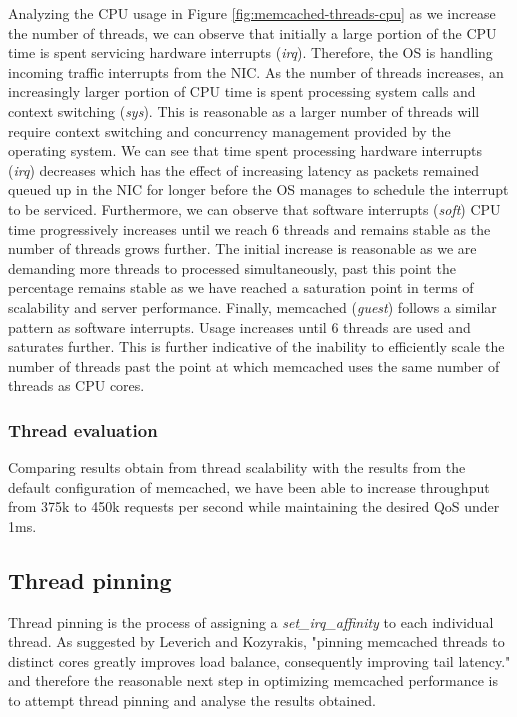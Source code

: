 Analyzing the CPU usage in Figure \ref{fig:memcached-threads-cpu} as we increase the number of threads, we can observe that initially a large portion of the CPU time is spent servicing hardware interrupts (\textit{irq}). Therefore, the OS is handling incoming traffic interrupts from the NIC. As the number of threads increases, an increasingly larger portion of CPU time is spent processing system calls and context switching (\textit{sys}). This is reasonable as a larger number of threads will require context switching and concurrency management provided by the operating system. We can see that time spent processing hardware interrupts (\textit{irq}) decreases which has the effect of increasing latency as packets remained queued up in the NIC for longer before the OS manages to schedule the interrupt to be serviced. Furthermore, we can observe that software interrupts (\textit{soft}) CPU time progressively increases until we reach 6 threads and remains stable as the number of threads grows further. The initial increase is reasonable as we are demanding more threads to processed simultaneously, past this point the percentage remains stable as we have reached a saturation point in terms of scalability and server performance. Finally, memcached (\textit{guest}) follows a similar pattern as software interrupts. Usage increases until 6 threads are used and saturates further. This is further indicative of the inability to efficiently scale the number of threads past the point at which memcached uses the same number of threads as CPU cores.

\subsubsection{Thread evaluation}
Comparing results obtain from thread scalability with the results from the default configuration of memcached, we have been able to increase throughput from 375k to 450k requests per second while maintaining the desired QoS under 1ms.



\subsection{Thread pinning}
Thread pinning is the process of assigning a \textit{set\_irq\_affinity} to each individual thread. As suggested by Leverich and Kozyrakis, "pinning memcached threads to distinct cores greatly improves load balance, consequently improving tail latency." \cite{leverich2014reconciling} and therefore the reasonable next step in optimizing memcached performance is to attempt thread pinning and analyse the results obtained.

